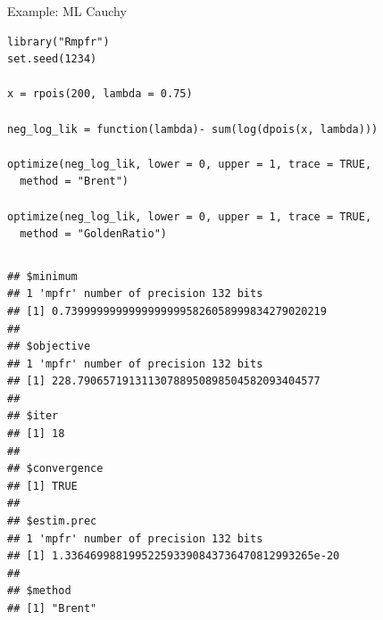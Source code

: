 \documentclass[11pt,compress,t,notes=noshow, xcolor=table]{beamer}
\begin{document}
\begin{vbframe}{Example: ML Cauchy}
\lz
\footnotesize
\begin{verbatim}
library("Rmpfr")
set.seed(1234)

x = rpois(200, lambda = 0.75)

neg_log_lik = function(lambda)- sum(log(dpois(x, lambda)))

optimize(neg_log_lik, lower = 0, upper = 1, trace = TRUE, 
  method = "Brent")

optimize(neg_log_lik, lower = 0, upper = 1, trace = TRUE, 
  method = "GoldenRatio")

\end{verbatim}







\framebreak 






\vspace*{-1cm}

\begin{columns}
\begin{column}{1\textwidth}
\begin{verbatim}
## $minimum
## 1 'mpfr' number of precision 132 bits
## [1] 0.73999999999999999995826058999834279020219
##
## $objective
## 1 'mpfr' number of precision 132 bits
## [1] 228.79065719131130788950898504582093404577
##
## $iter
## [1] 18
##
## $convergence
## [1] TRUE
##
## $estim.prec
## 1 'mpfr' number of precision 132 bits
## [1] 1.336469988199522593390843736470812993265e-20
##
## $method
## [1] "Brent"
\end{verbatim}
\end{column}
\end{columns}

\framebreak


\end{vbframe}
\end{document}
